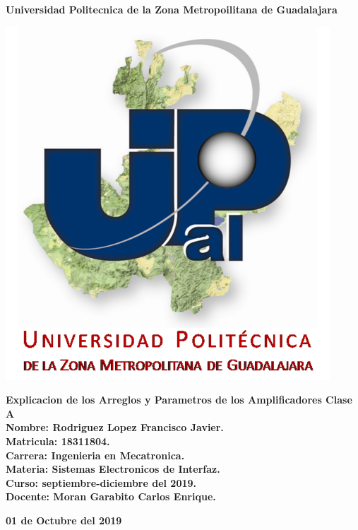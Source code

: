 \documentclass[12pt,a4paper]{article}
\author{Rodriguez Lopez Francisco Javier}
\begin{document}
\begin{center}
\LARGE \textbf{Universidad Politecnica de la Zona Metropoilitana de Guadalajara\\}


\includegraphics[scale=1]{Upzmg3.png} 

\large \textbf{Explicacion de los Arreglos y Parametros de los Amplificadores Clase A}\\
\vspace{2cm}
\large \textbf{Nombre: Rodriguez Lopez Francisco Javier.\\
\vspace{0.5cm} Matricula: 18311804.\\
\vspace{0.5cm} Carrera: Ingenieria en Mecatronica.\\
\vspace{0.5cm} Materia: Sistemas Electronicos de Interfaz.\\
\vspace{0.5cm} Curso: septiembre-diciembre del 2019.\\
\vspace{0.5cm} Docente: Moran Garabito Carlos Enrique.}


\vspace{6cm}
\small \textbf{01 de Octubre del 2019}
\end{center}
\end{document}
